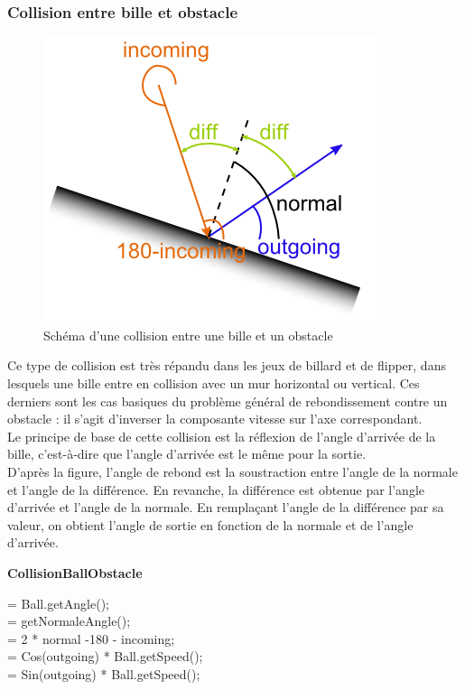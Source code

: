 \documentclass{report}
\begin{document}
\clearpage

\subsubsection{Collision entre bille et obstacle}

\begin{figure}[H]
\centering
\includegraphics[scale=1]{collision_bille_obstacle.png}
\caption{Schéma d'une collision entre une bille et un obstacle}
\end{figure}

Ce type de collision est très répandu dans les jeux de billard et de flipper, dans lesquels une bille entre en collision avec un mur horizontal ou vertical. Ces derniers sont les
cas basiques du problème général de rebondissement contre un obstacle : il s’agit d’inverser la composante vitesse sur l’axe correspondant. \\

Le principe de base de cette collision est la réflexion de l’angle d’arrivée de la bille, c’est-à-dire que l’angle d’arrivée est le même pour la sortie. \\

D’après la figure, l’angle de rebond est la soustraction entre l’angle de la normale et l’angle de la différence. En revanche, la différence est obtenue par l’angle d’arrivée et l’angle de la normale. En remplaçant l’angle de la différence par sa valeur, on obtient l’angle de sortie en fonction de la normale et de l’angle d’arrivée.

\begin{algorithm}[h]
\KwOut{}
    \caption{{\bf CollisionBallObstacle} \label{CollisionBallObstacle}}
    = Ball.getAngle();\\
    = getNormaleAngle();\\
    = 2 * normal -180 - incoming;\\
    = Cos(outgoing) * Ball.getSpeed();\\
    = Sin(outgoing) * Ball.getSpeed();\\
\end{algorithm}
\end{document}
